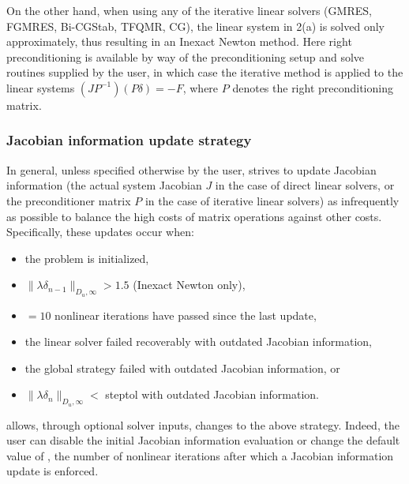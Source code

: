 On the other hand, when using any of the iterative linear solvers
(GMRES, FGMRES, Bi-CGStab, TFQMR, CG), the linear system in 2(a) is solved only
approximately, thus resulting in an Inexact Newton method.  Here right
preconditioning is available by way of the preconditioning setup and
solve routines supplied by the user, in which case the iterative
method is applied to the linear systems $(JP^{-1})(P\delta) = -F$,
where $P$ denotes the right preconditioning matrix.


\subsubsection*{Jacobian information update strategy}
In general, unless specified otherwise by the user, {\kinsol} strives to update
Jacobian information (the actual system Jacobian $J$ in the case of direct linear
solvers, or the preconditioner matrix $P$ in the case of iterative linear solvers)
as infrequently as possible to balance the high costs of matrix operations against 
other costs. Specifically, these updates occur when:
\begin{itemize}
\item the problem is initialized,
\item $\|\lambda\delta_{n-1}\|_{D_u,\infty} > 1.5$ (Inexact Newton only),
\item {}$=10$ nonlinear iterations have passed since the last update,
\item the linear solver failed recoverably with outdated Jacobian information,
\item the global strategy failed with outdated Jacobian information, or
\item $\|\lambda\delta_{n}\|_{D_u,\infty} < $ {\sc steptol} with outdated Jacobian
  information.
\end{itemize}
{\kinsol} allows, through optional solver inputs, changes to the above strategy.
Indeed, the user can disable the initial Jacobian information evaluation or change
the default value of , the number of nonlinear iterations after which a
Jacobian information update is enforced.



